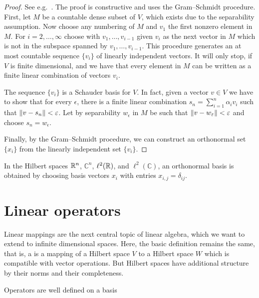 \begin{proof}
  See e.g.~\cite{Yosida80}. The proof is constructive and uses the
  Gram--Schmidt procedure. First, let $M$ be a countable dense subset
  of $V$, which exists due to the separability assumption. Now choose
  any numbering of $M$ and $v_1$ the first nonzero element in
  $M$. For $i=2,\dots,\infty$ choose with $v_1,\dots,v_{i-1}$ given
  $v_i$ as the next vector in $M$ which is not in the subspace spanned
  by $v_1,\dots,v_{i-1}$. This procedure generates an at most
  countable sequence $\{v_i\}$ of linearly independent vectors. It
  will only stop, if $V$ is finite dimensional, and we have that every
  element in $M$ can be written as a finite linear combination of
  vectors $v_i$.
  
  The sequence $\{v_i\}$ is a Schauder basis for $V$. In fact, given a
  vector $v\in V$ we have to show that for every $\epsilon$, there is
  a finite linear combination $s_n = \sum_{i=1}^n \alpha_i v_i$ such
  that $\lVert v-s_n\rVert < \varepsilon$. Let by separability $w_\epsilon$ in $M$
  be such that $\lVert v-w_\varepsilon\rVert < \varepsilon$ and choose $s_n =
  w_\epsilon$.
  
  Finally, by the Gram--Schmidt procedure, we can construct an
  orthonormal set $\{x_i\}$ from the linearly independent set $\{v_i\}$.
\end{proof}

\begin{example}
  In the Hilbert spaces $\mathbb R^n$, $\mathbb C^n$, $\ell^2(\mathbb R)$, and
  $\ell^2(\mathbb C)$, an orthonormal basis is obtained by choosing
  basis vectors $x_i$ with entries $x_{i,j} = \delta_{ij}$.
\end{example}

\section{Linear operators}

\begin{intro}
  Linear mappings are the next central topic of linear algebra, which
  we want to extend to infinite dimensional spaces. Here, the basic
  definition remains the same, that is, a  is
  a mapping of a Hilbert space $V$ to a Hilbert space $W$ which is
  compatible with vector operations. But Hilbert spaces have
  additional structure by their norms and their completeness.
\end{intro}

\begin{todo}
  Operators are well defined on a basis
\end{todo}

